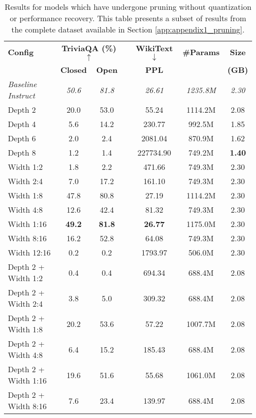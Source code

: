 {\begin{table}[!htbp]
\centering
\footnotesize
\caption[Results for Pruning-Only Configurations (Subset)]{Results for models which have undergone pruning without quantization or performance recovery. This table presents a subset of results from the complete dataset available in Section \ref{app:appendix1_pruning}.} \label{tab:pruning_only_results}
\label{tab:depth_pruning_results}
\begin{tabular}{lcccccc}
\hline
\textbf{Config} & \multicolumn{2}{c}{\textbf{TriviaQA (\%) $\uparrow$}} & & \textbf{WikiText $\downarrow$} & \textbf{\#Params} & \textbf{Size} \\
\cline{2-3}
& \textbf{Closed} & \textbf{Open} & & \textbf{PPL} & & \textbf{(GB)} \\
\hline
\textit{Baseline Instruct} & \textit{50.6} & \textit{81.8} & & \textit{26.61} & \textit{1235.8M} & \textit{2.30} \\
Depth 2 & 20.0 & 53.0 & & 55.24 & 1114.2M & 2.08 \\
Depth 4 & 5.6 & 14.2 & & 230.77 & 992.5M & 1.85 \\
Depth 6 & 2.0 & 2.4 & & 2081.04 & 870.9M & 1.62 \\
Depth 8 & 1.2 & 1.4 & & 227734.90 & 749.2M & \textbf{1.40} \\
Width 1:2 & 1.8 & 2.2 & & 471.66 & 749.3M & 2.30 \\
Width 2:4 & 7.0 & 17.2 & & 161.10 & 749.3M & 2.30 \\
Width 1:8 & 47.8 & 80.8 & & 27.19 & 1114.2M & 2.30 \\
Width 4:8 & 12.6 & 42.4 & & 81.32 & 749.3M & 2.30 \\
Width 1:16 & \textbf{49.2} & \textbf{81.8} & & \textbf{26.77} & 1175.0M & 2.30 \\
Width 8:16 & 16.2 & 52.8 & & 64.08 & 749.3M & 2.30 \\
Width 12:16 & 0.2 & 0.2 & & 1793.97 & 506.0M & 2.30 \\
Depth 2 + Width 1:2 & 0.4 & 0.4 & & 694.34 & 688.4M & 2.08 \\
Depth 2 + Width 2:4 & 3.8 & 5.0 & & 309.32 & 688.4M & 2.08 \\
Depth 2 + Width 1:8 & 20.2 & 53.6 & & 57.22 & 1007.7M & 2.08 \\
Depth 2 + Width 4:8 & 6.4 & 15.2 & & 185.43 & 688.4M & 2.08 \\
Depth 2 + Width 1:16 & 19.6 & 51.6 & & 55.68 & 1061.0M & 2.08 \\
Depth 2 + Width 8:16 & 7.6 & 23.4 & & 139.97 & 688.4M & 2.08 \\

\end{tabular}
\end{table}}
